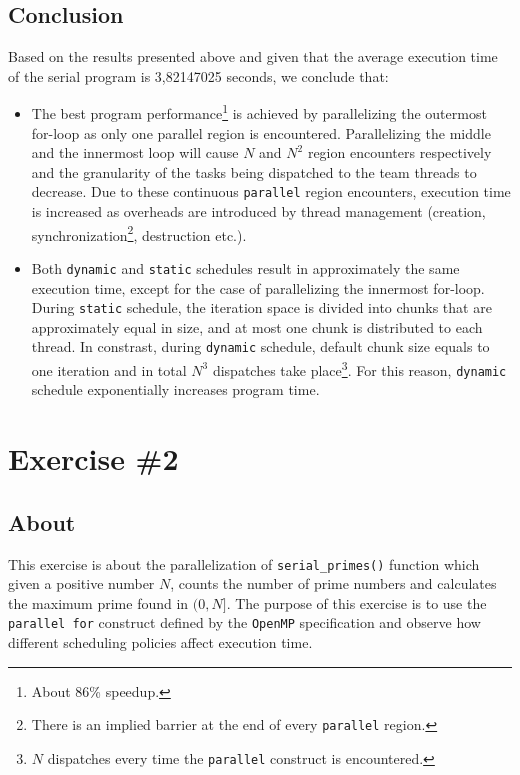 \documentclass{article}
\def\code#1{\texttt{#1}}
\begin{document}
\subsection{Conclusion}
Based on the results presented above and given that the average execution time of the serial
program is 3,82147025 seconds, we conclude that:

\begin{itemize}
 \item The best program performance\footnote{About 86\% speedup.} is achieved by
       parallelizing the outermost for-loop as only one parallel region is encountered.
       Parallelizing the middle and the innermost loop will cause $N$ and $N^2$ region
       encounters respectively and the granularity of the tasks being dispatched to
       the team threads to decrease. Due to these continuous \code{parallel} region
       encounters, execution time is increased as overheads are introduced by thread
       management (creation, synchronization\footnote{There is an implied barrier at
       the end of every \code{parallel} region.}, destruction etc.).
 \item Both \code{dynamic} and \code{static} schedules result in approximately the
       same execution time, except for the case of parallelizing the innermost 
       for-loop. During \code{static} schedule, the iteration space is divided
       into chunks that are approximately equal in size, and at most one chunk
       is distributed to each thread. In constrast, during \code{dynamic} schedule,
       default chunk size equals to one iteration and in total $N^3$ dispatches
       take place\footnote{$N$ dispatches every time the \code{parallel} construct
       is encountered.}. For this reason, \code{dynamic} schedule exponentially
       increases program time.
\end{itemize}



\section{Exercise \#2}

\subsection{About}
This exercise is about the parallelization of \code{serial\_primes()} function which given
a positive number $N$, counts the number of prime numbers and calculates the maximum prime
found in $(0,N]$. The purpose of this exercise is to use the \code{parallel for} construct
defined by the \texttt{OpenMP} specification and observe how different scheduling policies
affect execution time.
\end{document}
